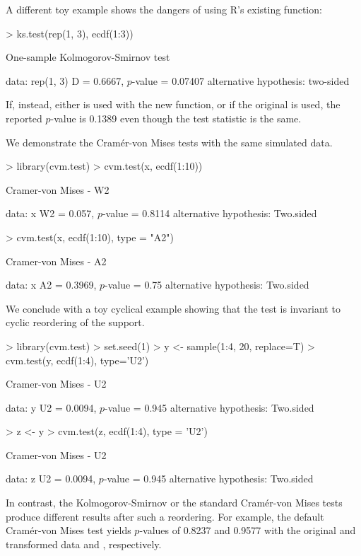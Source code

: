A different toy example shows the dangers of using R's existing
 function:
\begin{Schunk}
\begin{Sinput}
> ks.test(rep(1, 3), ecdf(1:3))
\end{Sinput}
\begin{Soutput}
	One-sample Kolmogorov-Smirnov test

data:  rep(1, 3) 
D = 0.6667, $p$-value = 0.07407
alternative hypothesis: two-sided 
\end{Soutput}
\end{Schunk}
If, instead, either  is used with the new
 function, or if the original 
is used, the reported $p$-value is 0.1389 even though the test statistic
is the same.

We demonstrate the Cram\'{e}r-von Mises tests with the same
simulated data. 
\begin{Schunk}
\begin{Sinput}
> library(cvm.test)
> cvm.test(x, ecdf(1:10))
\end{Sinput}
\begin{Soutput}
	Cramer-von Mises - W2

data:  x 
W2 = 0.057, $p$-value = 0.8114
alternative hypothesis: Two.sided 
\end{Soutput}
\begin{Sinput}
> cvm.test(x, ecdf(1:10), type = "A2")
\end{Sinput}
\begin{Soutput}
	Cramer-von Mises - A2

data:  x 
A2 = 0.3969, $p$-value = 0.75
alternative hypothesis: Two.sided 
\end{Soutput}
\end{Schunk}

We conclude with a toy cyclical example showing that the test is
invariant to cyclic reordering of the support.
\begin{Schunk}
\begin{Sinput}
> library(cvm.test)
> set.seed(1)
> y <- sample(1:4, 20, replace=T)
> cvm.test(y, ecdf(1:4), type='U2')
\end{Sinput}
\begin{Soutput}
	Cramer-von Mises - U2

data:  y 
U2 = 0.0094, $p$-value = 0.945
alternative hypothesis: Two.sided 
\end{Soutput}
\begin{Sinput}
> z <- y%
> cvm.test(z, ecdf(1:4), type = 'U2')
\end{Sinput}
\begin{Soutput}
	Cramer-von Mises - U2

data:  z 
U2 = 0.0094, $p$-value = 0.945
alternative hypothesis: Two.sided 
\end{Soutput}
\end{Schunk}
In contrast, the Kolmogorov-Smirnov or the standard Cram\'{e}r-von Mises tests
produce different results after such a reordering. For example, the default
Cram\'{e}r-von Mises test yields $p$-values of 0.8237 and 0.9577 with the original
and transformed data  and , respectively.

